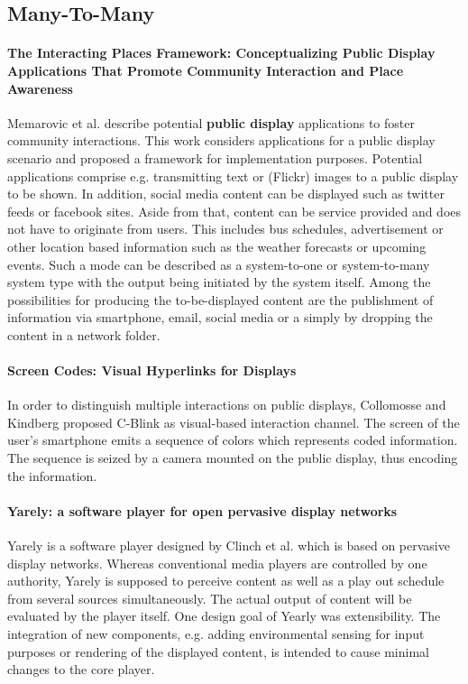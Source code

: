 \subsection{Many-To-Many}

\paragraph{The Interacting Places Framework: Conceptualizing Public Display Applications That Promote Community Interaction and Place Awareness}
Memarovic et al. \cite{memarovic_places} describe potential \textbf{public display} applications to foster community interactions.
This work considers applications for a public display scenario and proposed a framework for implementation purposes.
Potential applications comprise e.g. transmitting text or (Flickr) images to a public display to be shown.
In addition, social media content can be displayed such as twitter feeds or facebook sites.
Aside from that, content can be service provided and does not have to originate from users.
This includes bus schedules, advertisement or other location based information such as the weather forecasts or upcoming events.
Such a mode can be described as a system-to-one or system-to-many system type with the output being initiated by the system itself.
Among the possibilities for producing the to-be-displayed content are the publishment of information via smartphone, email, social media or a simply by dropping the content in a network folder.

\paragraph{Screen Codes: Visual Hyperlinks for Displays}
In order to distinguish multiple interactions on public displays, Collomosse and Kindberg \cite{Collomosse_ScreenCodes} proposed C-Blink as visual-based interaction channel. The screen of the user’s smartphone emits a sequence of colors which represents coded information. The sequence is seized by a camera mounted on the public display, thus encoding the information.

\paragraph{Yarely: a software player for open pervasive display networks}
Yarely is a software player designed by Clinch et al. \cite{Clinch_Yarely} which is based on pervasive display networks. Whereas conventional media players are controlled by one authority, Yarely is supposed to perceive content as well as a play out schedule from several sources simultaneously. The actual output of content will be evaluated by the player itself.
One design goal of Yearly was extensibility. The integration of new components, e.g. adding environmental sensing for input purposes or rendering of the displayed content, is intended to cause minimal changes to the core player.

